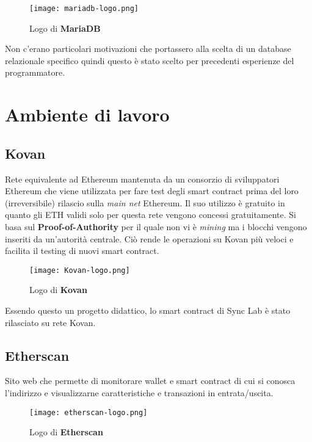     \begin{figure}[h!]
        \centering
        \texttt{[image: mariadb-logo.png]}
        \caption{Logo di \textbf{MariaDB}}
    \end{figure}

    Non c'erano particolari motivazioni che portassero alla scelta di un database relazionale specifico quindi questo è stato scelto per precedenti esperienze del programmatore.

\section{Ambiente di lavoro}
    \subsection{Kovan}
    Rete equivalente ad Ethereum mantenuta da un consorzio di sviluppatori Ethereum che viene utilizzata per fare test degli smart contract prima del loro (irreversibile) rilascio sulla \textit{main net} Ethereum. Il suo utilizzo è gratuito in quanto gli ETH validi solo per questa rete vengono concessi gratuitamente. Si basa sul \textbf{Proof-of-Authority} per il quale non vi è \textit{mining} ma i blocchi vengono inseriti da un'autorità centrale. Ciò rende le operazioni su Kovan più veloci e facilita il testing di nuovi smart contract.

    \begin{figure}[h!]
        \centering
        \texttt{[image: Kovan-logo.png]}
        \caption{Logo di \textbf{Kovan}}
    \end{figure}

    Essendo questo un progetto didattico, lo smart contract di Sync Lab è stato rilasciato su rete Kovan.

    \subsection{Etherscan}
    Sito web che permette di monitorare wallet e smart contract di cui si conosca l'indirizzo e visualizzarne caratteristiche e transazioni in entrata/uscita.

    \begin{figure}[h!]
        \centering
        \texttt{[image: etherscan-logo.png]}
        \caption{Logo di \textbf{Etherscan}}
    \end{figure}

